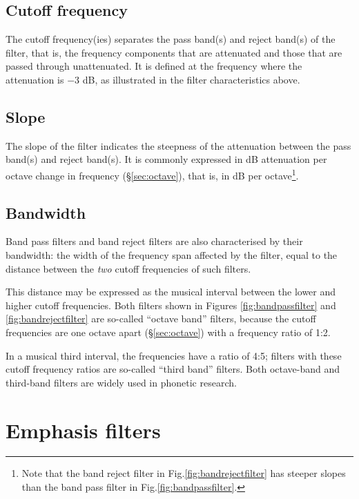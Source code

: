 \documentclass[
]{book}
\begin{document}
\subsection{Cutoff frequency}\label{cutoff-frequency}

The cutoff frequency(ies) separates the pass band(s) and reject band(s) of the filter, that is, the frequency components that are attenuated and those that are passed through unattenuated. It is defined at the frequency where the attenuation is \(-3\) dB, as illustrated in the filter characteristics above.

\subsection{Slope}\label{slope}

The slope of the filter indicates the steepness of the attenuation between the pass band(s) and reject band(s). It is commonly expressed in dB attenuation per octave change in frequency (§\ref{sec:octave}), that is, in dB per octave\footnote{Note that the band reject filter in Fig.\ref{fig:bandrejectfilter} has steeper slopes than the band pass filter in Fig.\ref{fig:bandpassfilter}.}.

\subsection{Bandwidth}\label{bandwidth}

Band pass filters and band reject filters are also characterised by their bandwidth: the width of the frequency span affected by the filter, equal to the distance between the \emph{two} cutoff frequencies of such filters.

This distance may be expressed as the musical interval between the lower and higher cutoff frequencies. Both filters shown in Figures \ref{fig:bandpassfilter} and \ref{fig:bandrejectfilter} are so-called ``octave band'' filters, because the cutoff frequencies are one octave apart (§\ref{sec:octave}) with a frequency ratio of 1:2.

In a musical third interval, the frequencies have a ratio of 4:5; filters with these cutoff frequency ratios are so-called ``third band'' filters. Both octave-band and third-band filters are widely used in phonetic research.

\section{Emphasis filters}\label{sec:emphasisfilters}
\end{document}
